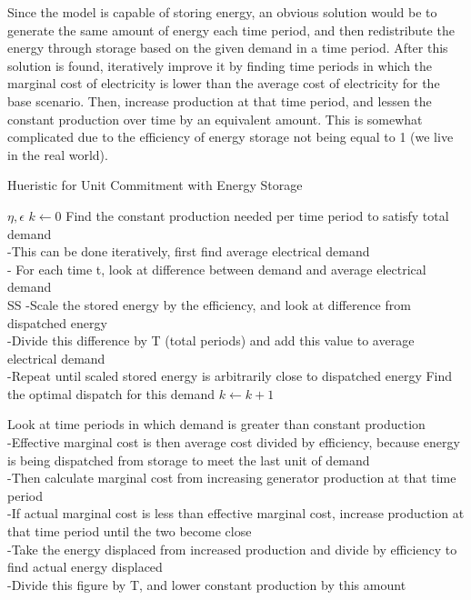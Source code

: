 Since the model is capable of storing energy, an obvious solution would be to generate the same
amount of energy each time period, and then redistribute the energy through storage based on the
given demand in a time period. After this solution is found, iteratively improve it by finding time periods
in which the marginal cost of electricity is lower than the average cost of electricity for the base
scenario. Then, increase production at that time period, and lessen the constant production over time
by an equivalent amount. This is somewhat complicated due to the efficiency of energy storage not
being equal to 1 (we live in the real world). \\

\begin{algorithm}
\caption{Hueristic for Unit Commitment with Energy Storage}
\begin{algorithmic}
\REQUIRE $ \eta, \epsilon $
\STATE $ k \gets 0 $
\STATE Find the constant production needed per time period to satisfy total demand  \\
	-This can be done iteratively, first find average electrical demand \\
	- For each time t, look at difference between demand and average electrical demand \\SS
	-Scale the stored energy by the efficiency, and look at difference from dispatched energy \\
	-Divide this difference by T (total periods) and add this value to average electrical demand  \\
	-Repeat until scaled stored energy is arbitrarily close to dispatched energy
\STATE Find the optimal dispatch for this demand 
	\STATE $k \gets k + 1 $

	\STATE Look at time periods in which demand is greater than constant production \\
	-Effective marginal cost is then average cost divided by efficiency, because energy is being
	dispatched from storage to meet the last unit of demand  \\
	-Then calculate marginal cost from increasing generator production at that time period \\
	-If actual marginal cost is less than effective marginal cost, increase production at that time
	period until the two become close  \\
	-Take the energy displaced from increased production and divide by efficiency to find actual
	energy displaced  \\
	-Divide this figure by T, and lower constant production by this amount
\ENDWHILE

\end{algorithmic}
\end{algorithm}

